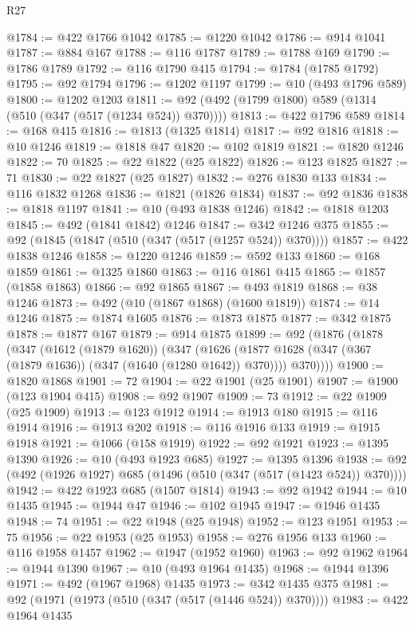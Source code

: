 \begin{lexlean}{R27}
\begin{coremodule}
@1784 := @422 @1766 @1042
@1785 := @1220 @1042
@1786 := @914 @1041
@1787 := @884 @167
@1788 := @116 @1787
@1789 := @1788 @169
@1790 := @1786 @1789
@1792 := @116 @1790 @415
@1794 := @1784 (@1785 @1792)
@1795 := @92 @1794
@1796 := @1202 @1197
@1799 := @10 (@493 @1796 @589)
@1800 := @1202 @1203
@1811 := @92 (@492 (@1799 @1800) @589 (@1314 (@510 (@347 (@517 (@1234 @524)) @370))))
@1813 := @422 @1796 @589
@1814 := @168 @415
@1816 := @1813 (@1325 @1814)
@1817 := @92 @1816
@1818 := @10 @1246
@1819 := @1818 @47
@1820 := @102 @1819
@1821 := @1820 @1246
@1822 := 70
@1825 := @22 @1822 (@25 @1822)
@1826 := @123 @1825
@1827 := 71
@1830 := @22 @1827 (@25 @1827)
@1832 := @276 @1830 @133
@1834 := @116 @1832 @1268
@1836 := @1821 (@1826 @1834)
@1837 := @92 @1836
@1838 := @1818 @1197
@1841 := @10 (@493 @1838 @1246)
@1842 := @1818 @1203
@1845 := @492 (@1841 @1842) @1246
@1847 := @342 @1246 @375
@1855 := @92 (@1845 (@1847 (@510 (@347 (@517 (@1257 @524)) @370))))
@1857 := @422 @1838 @1246
@1858 := @1220 @1246
@1859 := @592 @133
@1860 := @168 @1859
@1861 := @1325 @1860
@1863 := @116 @1861 @415
@1865 := @1857 (@1858 @1863)
@1866 := @92 @1865
@1867 := @493 @1819
@1868 := @38 @1246
@1873 := @492 (@10 (@1867 @1868) (@1600 @1819))
@1874 := @14 @1246
@1875 := @1874 @1605
@1876 := @1873 @1875
@1877 := @342 @1875
@1878 := @1877 @167
@1879 := @914 @1875
@1899 := @92
    (@1876
      (@1878
        (@347
          (@1612 (@1879 @1620))
          (@347
            (@1626 (@1877 @1628 (@347 (@367 (@1879 @1636)) (@347 (@1640 (@1280 @1642)) @370))))
            @370))))
@1900 := @1820 @1868
@1901 := 72
@1904 := @22 @1901 (@25 @1901)
@1907 := @1900 (@123 @1904 @415)
@1908 := @92 @1907
@1909 := 73
@1912 := @22 @1909 (@25 @1909)
@1913 := @123 @1912
@1914 := @1913 @180
@1915 := @116 @1914
@1916 := @1913 @202
@1918 := @116 @1916 @133
@1919 := @1915 @1918
@1921 := @1066 (@158 @1919)
@1922 := @92 @1921
@1923 := @1395 @1390
@1926 := @10 (@493 @1923 @685)
@1927 := @1395 @1396
@1938 := @92 (@492 (@1926 @1927) @685 (@1496 (@510 (@347 (@517 (@1423 @524)) @370))))
@1942 := @422 @1923 @685 (@1507 @1814)
@1943 := @92 @1942
@1944 := @10 @1435
@1945 := @1944 @47
@1946 := @102 @1945
@1947 := @1946 @1435
@1948 := 74
@1951 := @22 @1948 (@25 @1948)
@1952 := @123 @1951
@1953 := 75
@1956 := @22 @1953 (@25 @1953)
@1958 := @276 @1956 @133
@1960 := @116 @1958 @1457
@1962 := @1947 (@1952 @1960)
@1963 := @92 @1962
@1964 := @1944 @1390
@1967 := @10 (@493 @1964 @1435)
@1968 := @1944 @1396
@1971 := @492 (@1967 @1968) @1435
@1973 := @342 @1435 @375
@1981 := @92 (@1971 (@1973 (@510 (@347 (@517 (@1446 @524)) @370))))
@1983 := @422 @1964 @1435

\end{coremodule}
\end{lexlean}
